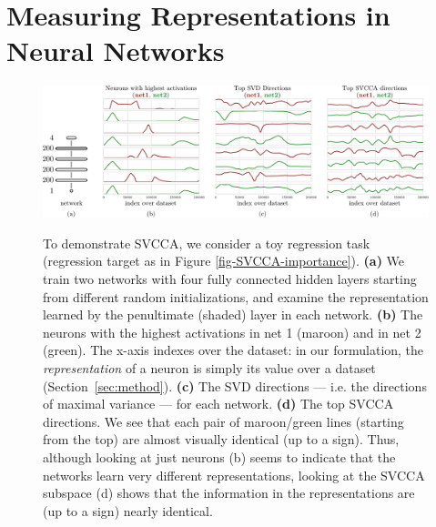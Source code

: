 \documentclass{article} %
\begin{document}
\section{Measuring Representations in Neural Networks}

\begin{figure}[t]
   \centering
   \includegraphics[width=1.0\columnwidth]{figures_nips/SVCCA_schematic/schematic_and_plots_crop.pdf}
   \label{fig-SVCCA-schematic}
   \caption{\small
     To demonstrate SVCCA, we consider a toy regression task (regression target as in Figure \ref{fig-SVCCA-importance}).
     \textbf{(a)} We train two networks with four fully connected hidden layers starting from different random initializations, and examine the representation learned by the penultimate (shaded) layer in each network.
     \textbf{(b)} The neurons with the highest activations in net 1 (maroon) and in net 2 (green). The x-axis indexes over the dataset: in our formulation, the \emph{representation} of a neuron is simply its value over a dataset (Section~\ref{sec:method}).
     \textbf{(c)} The SVD directions --- i.e. the directions of maximal variance --- for each network.
     \textbf{(d)} The top SVCCA directions. We see that each pair of maroon/green lines (starting from the top) are almost visually identical (up to a sign).
     Thus, although looking at just neurons (b) seems to indicate that the networks learn very different representations, looking at the SVCCA subspace (d) shows that the information in the representations are (up to a sign) nearly identical.}
   \label{fig_svcca_toy}
   \vspace*{-0.9em}
 \end{figure}
\end{document}
